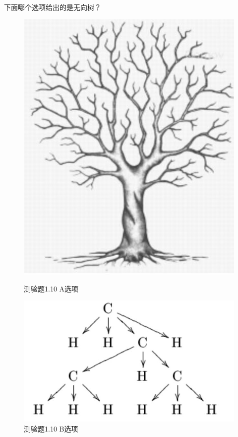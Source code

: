 \documentclass[UTF8, heading=true]{ctexart}
\begin{document}
下面哪个选项给出的是无向树？

\begin{figure}[H]
  \centering
  \begin{minipage}[t]{0.2\textwidth}
      \centering
      \includegraphics[width=1\textwidth]{1.10_1.jpg} %
      \caption{测验题1.10 A选项}
  \end{minipage}
  \hspace{0.1\textwidth} %
  \begin{minipage}[t]{0.35\textwidth}
      \centering
      \includegraphics[width=1\textwidth]{1.10_2.jpg} %
      \caption{测验题1.10 B选项}
\end{minipage}
\end{figure}
\end{document}
